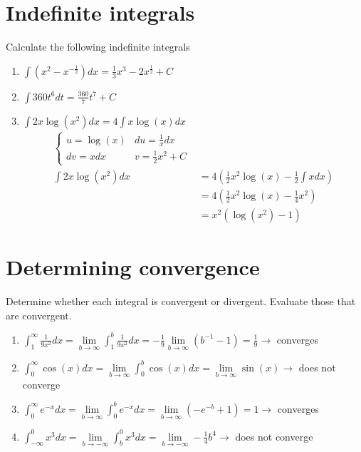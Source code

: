 \documentclass[12pt]{article}
\begin{document}
\section{Indefinite integrals}
Calculate the following indefinite integrals
\begin{enumerate}
    \item $\int (x^2 - x^{-\frac{1}{2}})dx = \frac{1}{3}x^3 -2x^{\frac{1}{2}}+C$
    \item $\int 360t^6dt = \frac{360}{7}t^7+C $
    \item $\int 2x \log(x^2) dx = 4\int x\log(x)dx$
    \begin{align*}
        \begin{cases}
            u=\log(x) & du = \frac{1}{x}dx
            \\ dv = x dx & v =\frac{1}{2}x^2+C
        \end{cases}
        \\ \int 2x \log(x^2) dx &= 4\left( \frac{1}{2}x^2 \log(x) - \frac{1}{2} \int x dx\right)
        \\ &=  4\left( \frac{1}{2}x^2 \log(x) - \frac{1}{4} x^2\right)
        \\ &= x^2(\log(x^2)-1)
    \end{align*}
\end{enumerate}

\section{Determining convergence}
Determine whether each integral is convergent or divergent. Evaluate those that are convergent.
\begin{enumerate}
    \item $\int_1^\infty \frac{1}{9x^2}dx = \lim\limits_{b \to \infty} \int_1^b \frac{1}{9x^2}dx = -\frac{1}{9}\lim\limits_{b \to \infty} (b^{-1}-1) = \frac{1}{9} \to $ converges
    \item $\int_0^\infty \cos(x)dx = \lim\limits_{b \to \infty}\int_0^b \cos(x)dx =\lim\limits_{b \to \infty} \sin(x) \to $ does not converge
    \item $\int_0^\infty e^{-x}dx = \lim\limits_{b \to \infty}\int_0^b e^{-x}dx=   \lim\limits_{b \to \infty} (-e^{-b}+1)=1 \to $ converges
    \item $\int_{-\infty}^0 x^3 dx = \lim\limits_{b \to -\infty}\int_{b}^0 x^3 dx = \lim\limits_{b \to -\infty} -\frac{1}{4}b^4 \to$ does not converge
\end{enumerate}
\end{document}
